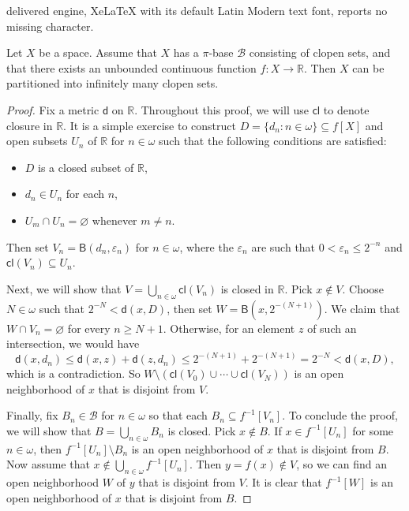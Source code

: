 \documentclass[10pt,a4paper]{amsart}
\newcommand{\BB}{\mathcal{B}}
\newcommand{\Ball}{\mathsf{B}}
\newcommand{\RRR}{\mathbb{R}}
\newcommand{\cl}{\mathsf{cl}}
\newcommand{\di}{\mathsf{d}}
\begin{document}
delivered engine, XeLaTeX with its default Latin Modern text font, reports no missing character.
\begin{lemma}\label{lemma_pseudocompact}
Let $X$ be a space. Assume that $X$ has a $\pi$-base $\BB$ consisting of clopen sets, and that there exists an unbounded continuous function $f:X\longrightarrow\RRR$. Then $X$ can be partitioned into infinitely many clopen sets.
\end{lemma}

\begin{proof}
Fix a metric $\di$ on $\RRR$. Throughout this proof, we will use $\cl$ to denote closure in $\RRR$. It is a simple exercise to construct $D=\{d_n:n\in\omega\}\subseteq f[X]$ and open subsets $U_n$ of $\RRR$ for $n\in\omega$ such that the following conditions are satisfied:
\begin{itemize}
\item $D$ is a closed subset of $\RRR$,
\item $d_n\in U_n$ for each $n$,
\item $U_m\cap U_n=\varnothing$ whenever $m\neq n$.
\end{itemize}
Then set $V_n=\Ball(d_n,\varepsilon_n)$ for $n\in\omega$, where the $\varepsilon_n$ are such that $0<\varepsilon_n\leq 2^{-n}$ and $\cl(V_n)\subseteq U_n$.

Next, we will show that $V=\bigcup_{n\in\omega}\cl(V_n)$ is closed in $\RRR$. Pick $x\notin V$. Choose $N\in\omega$ such that $2^{-N}<\di(x,D)$, then set $W=\Ball(x,2^{-(N+1)})$. We claim that $W\cap V_n=\varnothing$ for every $n\geq N+1$. Otherwise, for an element $z$ of such an intersection, we would have
$$
\di(x,d_n)\leq\di(x,z)+\di(z,d_n)\leq 2^{-(N+1)}+2^{-(N+1)}=2^{-N}<\di(x,D),
$$
which is a contradiction. So $W\setminus(\cl(V_0)\cup\cdots\cup\cl(V_N))$ is an open neighborhood of $x$ that is disjoint from $V$.

Finally, fix $B_n\in\BB$ for $n\in\omega$ so that each $B_n\subseteq f^{-1}[V_n]$. To conclude the proof, we will show that $B=\bigcup_{n\in\omega}B_n$ is closed. Pick $x\notin B$. If $x\in f^{-1}[U_n]$ for some $n\in\omega$, then $f^{-1}[U_n]\setminus B_n$ is an open neighborhood of $x$ that is disjoint from $B$. Now assume that $x\notin\bigcup_{n\in\omega} f^{-1}[U_n]$. Then $y=f(x)\notin V$, so we can find an open neighborhood $W$ of $y$ that is disjoint from $V$. It is clear that $f^{-1}[W]$ is an open neighborhood of $x$ that is disjoint from $B$.
\end{proof}
\end{document}
